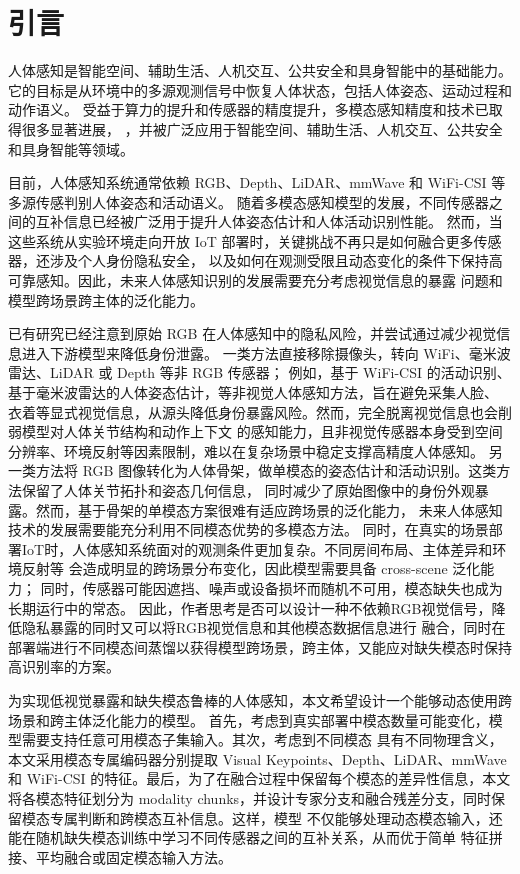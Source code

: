 \documentclass[journal]{IEEEtran}
\begin{document}
\section{引言}
人体感知是智能空间、辅助生活、人机交互、公共安全和具身智能中的基础能力。
它的目标是从环境中的多源观测信号中恢复人体状态，包括人体姿态、运动过程和动作语义。
受益于算力的提升和传感器的精度提升，多模态感知精度和技术已取得很多显著进展，
，并被广泛应用于智能空间、辅助生活、人机交互、公共安全和具身智能等领域。

目前，人体感知系统通常依赖 RGB、Depth、LiDAR、mmWave 和 WiFi-CSI 等多源传感判别人体姿态和活动语义。
随着多模态感知模型的发展，不同传感器之间的互补信息已经被广泛用于提升人体姿态估计和人体活动识别性能。
然而，当这些系统从实验环境走向开放 IoT 部署时，关键挑战不再只是如何融合更多传感器，还涉及个人身份隐私安全，
以及如何在观测受限且动态变化的条件下保持高可靠感知。因此，未来人体感知识别的发展需要充分考虑视觉信息的暴露
问题和模型跨场景跨主体的泛化能力。

已有研究已经注意到原始 RGB 在人体感知中的隐私风险，并尝试通过减少视觉信息进入下游模型来降低身份泄露。
一类方法直接移除摄像头，转向 WiFi、毫米波雷达、LiDAR 或 Depth 等非 RGB 传感器；
例如，基于 WiFi-CSI 的活动识别、基于毫米波雷达的人体姿态估计，等非视觉人体感知方法，旨在避免采集人脸、
衣着等显式视觉信息，从源头降低身份暴露风险。然而，完全脱离视觉信息也会削弱模型对人体关节结构和动作上下文
的感知能力，且非视觉传感器本身受到空间分辨率、环境反射等因素限制，难以在复杂场景中稳定支撑高精度人体感知。
另一类方法将 RGB 图像转化为人体骨架，做单模态的姿态估计和活动识别。这类方法保留了人体关节拓扑和姿态几何信息，
同时减少了原始图像中的身份外观暴露。然而，基于骨架的单模态方案很难有适应跨场景的泛化能力，
未来人体感知技术的发展需要能充分利用不同模态优势的多模态方法。
同时，在真实的场景部署IoT时，人体感知系统面对的观测条件更加复杂。不同房间布局、主体差异和环境反射等
会造成明显的跨场景分布变化，因此模型需要具备 cross-scene 泛化能力；
同时，传感器可能因遮挡、噪声或设备损坏而随机不可用，模态缺失也成为长期运行中的常态。
因此，作者思考是否可以设计一种不依赖RGB视觉信号，降低隐私暴露的同时又可以将RGB视觉信息和其他模态数据信息进行
融合，同时在部署端进行不同模态间蒸馏以获得模型跨场景，跨主体，又能应对缺失模态时保持高识别率的方案。


为实现低视觉暴露和缺失模态鲁棒的人体感知，本文希望设计一个能够动态使用跨场景和跨主体泛化能力的模型。
首先，考虑到真实部署中模态数量可能变化，模型需要支持任意可用模态子集输入。其次，考虑到不同模态
具有不同物理含义，本文采用模态专属编码器分别提取 Visual Keypoints、Depth、LiDAR、mmWave 和 
WiFi-CSI 的特征。最后，为了在融合过程中保留每个模态的差异性信息，本文将各模态特征划分为
modality chunks，并设计专家分支和融合残差分支，同时保留模态专属判断和跨模态互补信息。这样，模型
不仅能够处理动态模态输入，还能在随机缺失模态训练中学习不同传感器之间的互补关系，从而优于简单
特征拼接、平均融合或固定模态输入方法。
\end{document}
